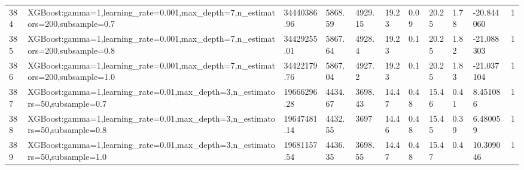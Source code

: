 \begin{longtable}{C{0.8cm} L{2cm} C{1.15cm} C{1.15cm} C{1.15cm} C{1.15cm} C{0.85cm} C{1.25cm} C{1.2cm} C{1.5cm} C{1.0cm}}
384 & XGBoost:\newline gamma=1,\newline learning\_rate=0.001,\newline max\_depth=7,\newline n\_estimators=200,\newline subsample=0.7 & 34440386.96 & 5868.59 & 4929.15 & 19.23 & 0.09 & 20.25 & 1.78 & -20.844060 & 1 \\
385 & XGBoost:\newline gamma=1,\newline learning\_rate=0.001,\newline max\_depth=7,\newline n\_estimators=200,\newline subsample=0.8 & 34429255.01 & 5867.64 & 4928.4 & 19.23 & 0.1 & 20.25 & 1.82 & -21.088303 & 1 \\
386 & XGBoost:\newline gamma=1,\newline learning\_rate=0.001,\newline max\_depth=7,\newline n\_estimators=200,\newline subsample=1.0 & 34422179.76 & 5867.04 & 4927.2 & 19.23 & 0.1 & 20.25 & 1.83 & -21.037104 & 1 \\
387 & XGBoost:\newline gamma=1,\newline learning\_rate=0.01,\newline max\_depth=3,\newline n\_estimators=50,\newline subsample=0.7 & 19666296.28 & 4434.67 & 3698.43 & 14.47 & 0.48 & 15.46 & 0.41 & 8.451086 & 1 \\
388 & XGBoost:\newline gamma=1,\newline learning\_rate=0.01,\newline max\_depth=3,\newline n\_estimators=50,\newline subsample=0.8 & 19647481.14 & 4432.55 & 3697 & 14.46 & 0.48 & 15.45 & 0.39 & 6.480059 & 1 \\
389 & XGBoost:\newline gamma=1,\newline learning\_rate=0.01,\newline max\_depth=3,\newline n\_estimators=50,\newline subsample=1.0 & 19681157.54 & 4436.35 & 3698.55 & 14.47 & 0.48 & 15.47 & 0.4 & 10.309046 & 1 \\

\end{longtable}
